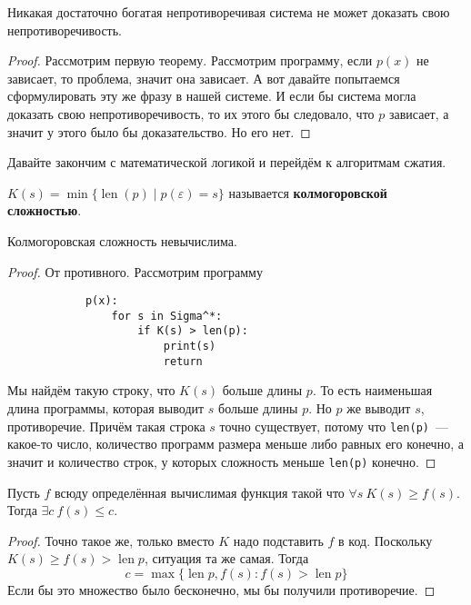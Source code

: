 \documentclass{article}
\begin{document}
    \begin{theorem}
        Никакая достаточно богатая непротиворечивая система не может доказать свою непротиворечивость.
    \end{theorem}
    \begin{proof}
        Рассмотрим первую теорему. Рассмотрим программу, если $p(x)$ не зависает, то проблема, значит она зависает. А вот давайте попытаемся сформулировать эту же фразу в нашей системе. И если бы система могла доказать свою непротиворечивость, то их этого бы следовало, что $p$ зависает, а значит у этого было бы доказательство. Но его нет.
    \end{proof}
    \begin{remark}
        Давайте закончим с математической логикой и перейдём к алгоритмам сжатия.
    \end{remark}
    \begin{definition}
        $K(s)=\min\{\operatorname{len}(p)\mid p(\varepsilon)=s\}$ называется \textbf{колмогоровской сложностью}.
    \end{definition}
    \begin{theorem}
        Колмогоровская сложность невычислима.
    \end{theorem}
    \begin{proof}
        От противного. Рассмотрим программу
        \begin{verbatim}
            p(x):
                for s in Sigma^*:
                    if K(s) > len(p):
                        print(s)
                        return
        \end{verbatim}
        Мы найдём такую строку, что $K(s)$ больше длины $p$. То есть наименьшая длина программы, которая выводит $s$ больше длины $p$. Но $p$ же выводит $s$, противоречие. Причём такая строка $s$ точно существует, потому что \Verb|len(p)|~--- какое-то число, количество программ размера меньше либо равных его конечно, а значит и количество строк, у которых сложность меньше \Verb|len(p)| конечно.
    \end{proof}
    \begin{theorem}
        Пусть $f$ всюду определённая вычислимая функция такой что $\forall s~K(s)\geqslant f(s)$. Тогда $\exists c~f(s)\leqslant c$.
    \end{theorem}
    \begin{proof}
        Точно такое же, только вместо $K$ надо подставить $f$ в код. Поскольку $K(s)\geqslant f(s)>\operatorname{len}p$, ситуация та же самая. Тогда
        $$
        c=\max\{\operatorname{len}p,f(s):f(s)>\operatorname{len}p\}
        $$
        Если бы это множество было бесконечно, мы бы получили противоречие.
    \end{proof}
\end{document}
